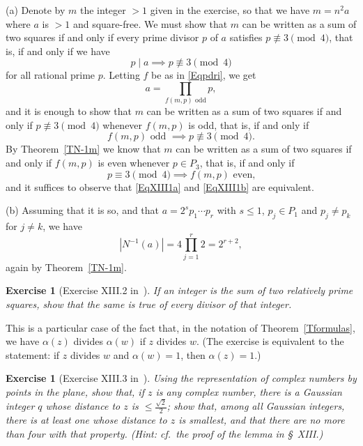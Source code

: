 \documentclass[12pt,letterpaper]{article}
\newtheorem{exer}[thm]{Exercise}
\theoremstyle{definition}
\begin{document}
(a) Denote by $m$ the integer $>1$ given in the exercise, so that we have $m=n^2a$ where $a$ is $>1$ and square-free. We must show that $m$ can be written as a sum of two squares if and only if every prime divisor $p$ of $a$ satisfies $p\not\equiv 3\pmod 4$, that is, if and only if we have 
$$
p\mid a\implies p\not\equiv 3\pmod 4
$$ 
for all rational prime $p$. Letting $f$ be as in \eqref{Eqpdri}, we get 
$$
a=\prod_{f(m,p)\text{ odd}}p,
$$ 
and it is enough to show that $m$ can be written as a sum of two squares if and only if $p\not\equiv 3\pmod 4$ whenever $f(m,p)$ is odd, that is, if and only if 
\begin{equation}\label{EqXIII1a}
f(m,p) \text{ odd } \implies p\not\equiv 3\pmod 4.
\end{equation} 
By Theorem~\ref{TN-1m} we know that $m$ can be written as a sum of two squares if and only if $f(m,p)$ is even whenever $p \in P_3$, that is, if and only if 
\begin{equation}\label{EqXIII1b}
p\equiv 3\pmod 4 \implies f(m,p) \text{ even,}
\end{equation} 
and it suffices to observe that \eqref{EqXIII1a} and \eqref{EqXIII1b} are equivalent. 

(b) Assuming that it is so, and that $a=2^sp_1\cdots p_r$ with $s\le1$, $p_j\in P_1$ and $p_j\ne p_k$ for $j\ne k$, we have 
$$
|N^{-1}(a)| = 4 \prod_{j=1}^r 2 = 2^{r+2},
$$ 
again by Theorem~\ref{TN-1m}. 

\begin{exer}[Exercise XIII.2 in~\cite{weil1979}]
If an integer is the sum of two relatively prime squares, show that the same is true of every divisor of that integer.
\end{exer}

This is a particular case of the fact that, in the notation of Theorem~\ref{Tformulas}, we have $\alpha(z)$ divides $\alpha(w)$ if $z$ divides $w$. (The exercise is equivalent to the statement: if $z$ divides $w$ and $\alpha(w)=1$, then $\alpha(z)=1$.) 

\begin{exer}[Exercise XIII.3 in~\cite{weil1979}]\label{ExXIII3}
Using the representation of complex numbers by points in the plane, show that, if $z$ is any complex number, there is a Gaussian integer $q$ whose distance to $z$ is $\le\frac{\sqrt{2}}{2}$; show that, among all Gaussian integers, there is at least one whose distance to $z$ is smallest, and that there are no more than four with that property. (Hint: cf.\ the proof of the lemma in \S~XIII.)
\end{exer}
\end{document}
